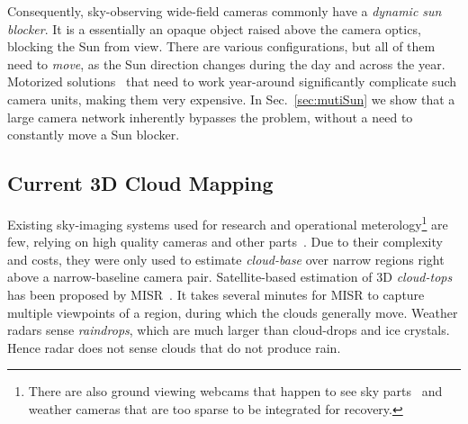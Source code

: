 \documentclass[runningheads]{llncs}
\begin{document}
Consequently, sky-observing wide-field cameras commonly have a {\em dynamic sun blocker}. It is a essentially an opaque object raised above the camera optics, blocking the Sun from view. There are various configurations, but all of them need to {\em move}, as the Sun direction changes during the day and across the year. Motorized solutions~\cite{Pust2008} that need to work year-around significantly complicate such camera units, making them very expensive. In Sec.~\ref{sec:mutiSun} we show that a large camera network inherently bypasses the problem, without a need to constantly move a Sun blocker.

\subsection{Current 3D Cloud Mapping}
\label{sec:current3D}


Existing sky-imaging systems used for research and operational meterology\footnote{There are also ground viewing webcams that happen to see sky parts~\cite{bradley} and weather cameras
that are too sparse to be integrated for recovery.} are few, relying on high quality cameras and other parts~\cite{allmen,angeo-27-953-2009,cazorla,long,Seiz,kassianov}. Due to their complexity and costs, they were only used to estimate {\em cloud-base} over narrow regions right above a narrow-baseline camera pair. Satellite-based estimation of 3D {\em cloud-tops} has been proposed by MISR~\cite{Seiz2006}. It takes several minutes for MISR to capture multiple viewpoints of a region, during which the clouds generally move. Weather radars sense {\em raindrops}, which are much larger than cloud-drops and ice crystals. Hence radar does not sense clouds that do not produce rain.


%



\end{document}
